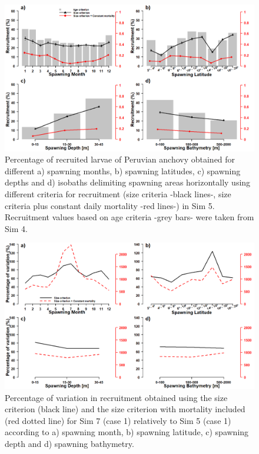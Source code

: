 \begin{figure}[ht]
	\includegraphics[width=1.0\textwidth]{figures/Fig3_04.png}
	\centering
	\caption{Percentage of recruited larvae of Peruvian anchovy obtained for different a) spawning months, b) spawning latitudes, c) spawning depths and d) isobaths delimiting spawning areas horizontally using different criteria for recruitment (size criteria -black lines-, size criteria plus constant daily mortality -red lines-) in Sim 5. Recruitment values based on age criteria -grey bars- were taken from Sim 4.}
	\label{Fig3_04}
\end{figure}

\begin{figure}[ht]
	\includegraphics[width=1.0\textwidth]{figures/Fig3_04S.png}
	\centering
	\caption{Percentage of variation in recruitment obtained using the size criterion (black line) and the size criterion with mortality included (red dotted line) for Sim 7 (case 1) relatively to Sim 5 (case 1) according to a) spawning month, b) spawning latitude, c) spawning depth and d) spawning bathymetry.}
	\label{Fig3_04S}
\end{figure}

